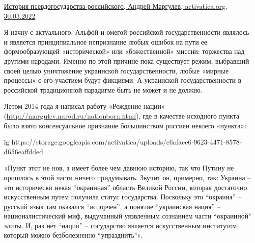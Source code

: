 
 
 
 
 
\zzSecCmt

\begin{itemize} %


\href{https://activatica.org/content/d5f30299-9434-404b-b405-8d8dcfaae368/istoriya-psevdogosudarstva-rossijskogo}{%
История псевдогосударства российского, Андрей Маргулев, activatica.org, 30.03.2022%
}

\raggedcolumns
\begin{multicols}{2} %
\setlength{\parindent}{0pt}

Я начну с актуального. Альфой и омегой российской государственности являлось и
является принципиальное непризнание любых ошибок на пути ее формообразующей
«исторической» или «божественной» миссии: торжества над другими народами.
Именно по этой причине пока существует режим, выбравший своей целью уничтожение
украинской государственности, любые «мирные процессы» с его участием будут
фикциями. А украинской государственности в российской традиционной парадигме
быть не может и не должно.

Летом 2014 года я написал работу «Рождение нации»
(\url{http://margulev.narod.ru/nationborn.html}), где в качестве исходного
пункта было взято консенсуальное признание большинством россиян некоего
«пункта»:

\ifcmt
  ig https://storage.googleapis.com/activatica/uploads/c6aface6-9623-4471-8578-d656eaffdded
\fi

«Пункт этот не нов, а имеет более чем давнюю историю, так что Путину не
пришлось в этой части ничего придумывать. Звучит он, примерно, так: Украина –
это исторически некая \enquote{окраинная} область Великой России, которая
достаточно искусственным путем получила статус государства. Поскольку это
\enquote{окраина} – русский язык там оказался \enquote{испорчен}, а понятие
\enquote{украинская нация} – националистический миф, выдуманный уязвленным
сознанием части \enquote{окраинной} элиты. И, раз нет \enquote{нации} –
государство является искусственным институтом, который можно безболезненно
\enquote{упразднить}».


\end{multicols}
\end{itemize}
